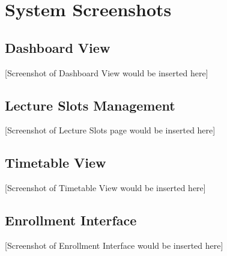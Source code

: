 \chapter{System Screenshots}

\section{Dashboard View}
[Screenshot of Dashboard View would be inserted here]

\section{Lecture Slots Management}
[Screenshot of Lecture Slots page would be inserted here]

\section{Timetable View}
[Screenshot of Timetable View would be inserted here]

\section{Enrollment Interface}
[Screenshot of Enrollment Interface would be inserted here]
